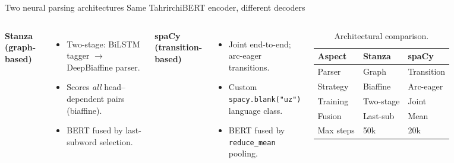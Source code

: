 \documentclass[t,10pt]{beamer}
\begin{document}
\begin{frame}{Two neural parsing architectures}%
             {Same TahrirchiBERT encoder, different decoders}
  \begin{columns}[onlytextwidth]
      \footnotesize
      \textbf{Stanza (graph-based)}
      \begin{itemize}
        \item Two-stage: BiLSTM tagger $\to$ DeepBiaffine parser.
        \item Scores \emph{all} head--dependent pairs (biaffine).
        \item BERT fused by \alert{last-subword} selection.
      \end{itemize}
      \medskip
      \textbf{spaCy (transition-based)}
      \begin{itemize}
        \item Joint end-to-end; arc-eager transitions.
        \item Custom \texttt{spacy.blank("uz")} language class.
        \item BERT fused by \texttt{reduce\_mean} pooling.
      \end{itemize}
      \begin{table}
        \footnotesize
        \begin{tabular}{lll}
          \textbf{Aspect} & \textbf{Stanza} & \textbf{spaCy}\\
          \toprule
          Parser   & Graph      & Transition \\
          Strategy & Biaffine   & Arc-eager  \\
          Training & Two-stage  & Joint      \\
          Fusion   & Last-sub   & Mean       \\
          Max steps& 50k        & 20k        \\
          \bottomrule
        \end{tabular}
        \caption{Architectural comparison.}
      \end{table}
  \end{columns}
\end{frame}
\end{document}
